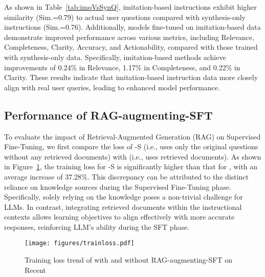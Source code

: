 As shown in Table~\ref{tab:imqVsSynQ}, imitation-based instructions exhibit higher similarity (Sim.=0.79) to actual user questions compared with synthesis-only instructions (Sim.=0.76). Additionally, models fine-tuned on imitation-based data demonstrate improved performance across various metrics, including Relevance, Completeness, Clarity, Accuracy, and Actionability, compared with those trained with synthesis-only data. Specifically, imitation-based methods achieve improvements of 0.24\% in Relevance, 1.17\% in Completeness, and 0.22\% in Clarity. These results indicate that imitation-based instruction data more closely align with real user queries, leading to enhanced model performance.

\subsection{Performance of RAG-augmenting-SFT }
\label{sec:rag_in_sft}


To evaluate the impact of Retrieval-Augmented Generation (RAG) on Supervised Fine-Tuning, we first compare the loss of \ourmodel-S  (i.e., uses only the original questions without any retrieved documents) with \ourmodel (i.e., uses retrieved documents). As shown in Figure~\ref{fig:trainloss}, the training loss for \ourmodel-S is significantly higher than that for \ourmodel, with an average increase of 37.28\%. This discrepancy can be attributed to the distinct reliance on knowledge sources during the Supervised Fine-Tuning phase. Specifically, solely relying on the knowledge poses a non-trivial challenge for LLMs. In contrast, integrating retrieved documents within the instructional contexts allows learning objectives to align effectively with more accurate responses, reinforcing LLM's ability during the SFT phase. 


\begin{figure}[htbp]
\centering
\texttt{[image: figures/trainloss.pdf]}
    \caption{Training loss trend of \ourmodel with and without RAG-augmenting-SFT on Recent}
    \label{fig:trainloss}
\end{figure}


